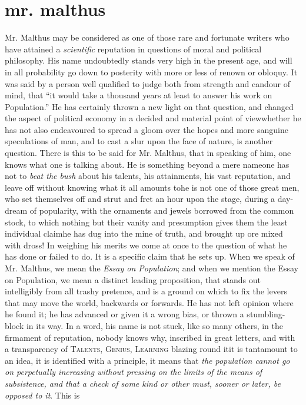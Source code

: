 \chapter[Mr. Malthus]{mr. malthus}

Mr. Malthus may be considered as one of those rare and fortunate
writers who have attained a \emph{scientific} reputation in
questions of moral and political philosophy. His name undoubtedly
stands very high in the present age, and will in all probability
go down to posterity with more or less of renown or obloquy. It
was said by a person well qualified to judge both from strength
and candour of mind, that ``it would take a thousand years at
least to answer his work on Population.'' He has certainly thrown
a new light on that question, and changed the aspect of political
economy in a decided and material point of view\textemdash whether
he has not also endeavoured to spread a gloom over the hopes and
more sanguine speculations of man, and to cast a slur upon the
face of nature, is another question. There is this to be said for
Mr. Malthus, that in speaking of him, one knows what one is
talking about. He is something beyond a mere name\textemdash one
has not to \emph{beat the bush} about his talents, his
attainments, his vast reputation, and leave off without knowing
what it all amounts to\textemdash he is not one of those great
men, who set themselves off and strut and fret an hour upon the
stage, during a day-dream of popularity, with the ornaments and
jewels borrowed from the common stock, to which nothing but their
vanity and presumption gives them the least individual
claim\textemdash he has dug into the mine of truth, and brought up
ore mixed with dross! In weighing his merits we come at once to
the question of what he has done or failed to do. It is a specific
claim that he sets up. When we speak of Mr. Malthus, we mean the
\emph{Essay on Population}; and when we mention the Essay on
Population, we mean a distinct leading proposition, that stands
out intelligibly from all trashy pretence, and is a ground on
which to fix the levers that may move the world, backwards or
forwards. He has not left opinion where he found it; he has
advanced or given it a wrong bias, or thrown a stumbling-block in
its way. In a word, his name is not stuck, like so many others, in
the firmament of reputation, nobody knows why, inscribed in great
letters, and with a transparency of \textsc{Talents, Genius,
Learning} blazing round it\textemdash it is tantamount to an idea,
it is identified with a principle, it means that \emph{the
population cannot go on perpetually increasing without pressing on
the limits of the means of subsistence, and that a check of some
kind or other must, sooner or later, be opposed to it}. This is
